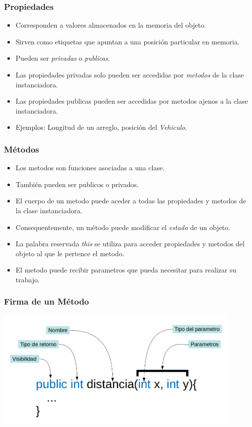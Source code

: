 \documentclass{beamer}
\begin{document}
\begin{frame}
\frametitle{Propiedades}
\begin{itemize}
    \item Corresponden a valores almacenados en la memoria del objeto.
    \item Sirven como etiquetas que apuntan a una posici\'on particular en memoria.
    \item Pueden ser \emph{privadas} o \emph{publicas}.
    \item Las propiedades privadas solo pueden ser accedidas por \emph{metodos} de la clase instanciadora.
    \item Las propiedades publicas pueden ser accedidas por metodos ajenos a la clase instanciadora.
    \item Ejemplos: Longitud de un arreglo, posici\'on del \emph{Vehiculo}.
\end{itemize}
\end{frame}

\begin{frame}
\frametitle{M\'etodos}
\begin{itemize}
    \item Los metodos son funciones asociadas a una clase.
    \item Tambi\'en pueden ser publicos o privados.
    \item El cuerpo de un metodo puede aceder a todas las propiedades y metodos de la clase instanciadora.
    \item Consequentemente, un m\'etodo puede modificar el \emph{estado} de un objeto.
    \item La palabra reservada \emph{this} se utiliza para acceder propiedades y metodos del objeto al que le pertence el metodo.
    \item El metodo puede recibir parametros que pueda necesitar para realizar su trabajo.
\end{itemize}
\end{frame}

\begin{frame}
\frametitle{Firma de un M\'etodo}
\includegraphics[width=12cm]{Firma.png}
\end{frame}
\end{document}
